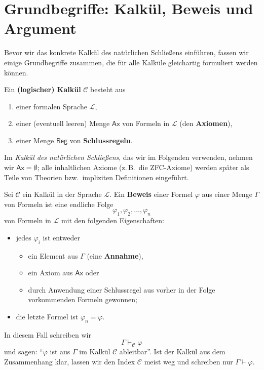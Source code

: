 \documentclass[main.tex]{subfiles}
\begin{document}
\section{Grundbegriffe: Kalkül, Beweis und Argument}

Bevor wir das konkrete Kalkül des natürlichen Schließens einführen,
fassen wir einige Grundbegriffe zusammen, die für alle Kalküle
gleichartig formuliert werden können.

\begin{definition}[Kalkül]
Ein \textbf{(logischer) Kalkül} \(\mathcal C\) besteht aus
\begin{enumerate}
  \item einer formalen Sprache \(\mathcal L\),
  \item einer (eventuell leeren) Menge \(\mathsf{Ax}\) von Formeln
        in \(\mathcal L\) (den \textbf{Axiomen}),
  \item einer Menge \(\mathsf{Reg}\) von \textbf{Schlussregeln}.
\end{enumerate}
Im \emph{Kalkül des natürlichen Schließens}, das wir im Folgenden
verwenden, nehmen wir \(\mathsf{Ax} = \emptyset\); alle inhaltlichen
Axiome (z.\,B.\ die ZFC-Axiome) werden später als Teile von Theorien
bzw.\ impliziten Definitionen eingeführt.
\end{definition}

\begin{definition}[Beweis]
Sei \(\mathcal C\) ein Kalkül in der Sprache \(\mathcal L\).
Ein \textbf{Beweis} einer Formel \(\varphi\) aus einer Menge
\(\Gamma\) von Formeln ist eine endliche Folge
\[
  \varphi_1,\varphi_2,\dots,\varphi_n
\]
von Formeln in \(\mathcal L\) mit den folgenden Eigenschaften:
\begin{itemize}
  \item jedes \(\varphi_i\) ist entweder
    \begin{itemize}
      \item ein Element aus \(\Gamma\) (eine \textbf{Annahme}),
      \item ein Axiom aus \(\mathsf{Ax}\) oder
      \item durch Anwendung einer Schlussregel aus vorher in der
            Folge vorkommenden Formeln gewonnen;
    \end{itemize}
  \item die letzte Formel ist \(\varphi_n = \varphi\).
\end{itemize}
In diesem Fall schreiben wir
\[
  \Gamma \vdash_{\mathcal C} \varphi
\]
und sagen: \enquote{\(\varphi\) ist aus \(\Gamma\) im Kalkül
\(\mathcal C\) ableitbar}. Ist der Kalkül aus dem Zusammenhang
klar, lassen wir den Index \(\mathcal C\) meist weg und schreiben
nur \(\Gamma \vdash \varphi\).
\end{definition}
\end{document}

